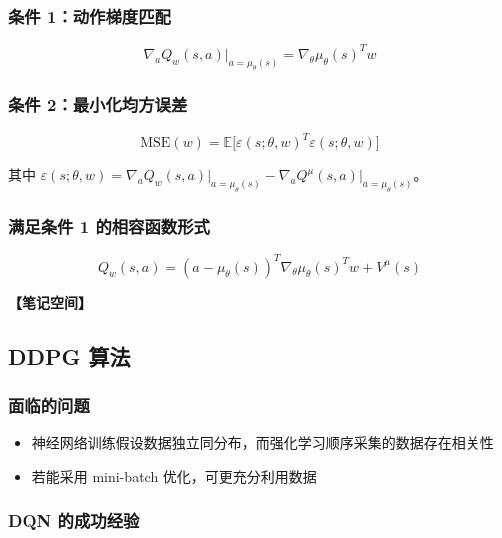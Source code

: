 \documentclass[12pt,a4paper]{article}
\newcommand{\notespace}[1][3cm]{%
  \vspace{#1}%
  \noindent\textbf{【笔记空间】}%
  \vspace{#1}%
}
\newcommand{\E}{\mathbb{E}}
\newcommand{\1}{\mathbf{1}}
\begin{document}
\subsubsection*{条件 1：动作梯度匹配}

\begin{equation}
\nabla_a Q_w(s,a)\big|_{a=\mu_\theta(s)}=\nabla_\theta\mu_\theta(s)^T w
\end{equation}

\subsubsection*{条件 2：最小化均方误差}

\begin{equation}
\mathrm{MSE}(w)=\E\bigl[\varepsilon(s;\theta,w)^T\varepsilon(s;\theta,w)\bigr]
\end{equation}

其中 $\varepsilon(s;\theta,w)=\nabla_a Q_w(s,a)\big|_{a=\mu_\theta(s)}-\nabla_a Q^\mu(s,a)\big|_{a=\mu_\theta(s)}$。

\subsubsection*{满足条件 1 的相容函数形式}

\begin{equation}
Q_w(s,a)=(a-\mu_\theta(s))^T\nabla_\theta\mu_\theta(s)^T w+V^\mu(s)
\end{equation}

\notespace[2cm]

\subsection{DDPG 算法}

\subsubsection*{面临的问题}

\begin{itemize}[leftmargin=2em]
  \item 神经网络训练假设数据独立同分布，而强化学习顺序采集的数据存在相关性
  \item 若能采用 mini-batch 优化，可更充分利用数据
\end{itemize}

\subsubsection*{DQN 的成功经验}
\end{document}
